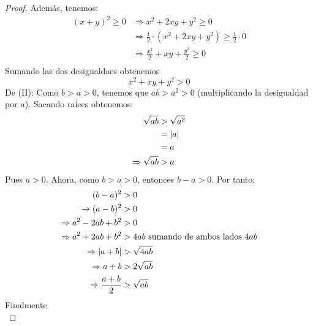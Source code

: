 \documentclass[12pt]{article}
\begin{document}
\begin{enumerate}
\begin{proof}
            Además, tenemos:
            \begin{equation*}
                \begin{split}
                    \left(x+y\right)^2\geq0 &\Rightarrow x^2+2xy+y^2\geq0 \\
                    &\Rightarrow \frac{1}{2}\cdot\left(x^2+2xy+y^2\right)\geq\frac{1}{2}\cdot0 \\
                    &\Rightarrow \frac{x^2}{2}+xy+\frac{y^2}{2}\geq0 \\
                \end{split}
            \end{equation*}
            Sumando las dos desigualdaes obtenemos
            \begin{equation*}
                x^2+xy+y^2>0
            \end{equation*}
            De (II): Como $b>a>0$, tenemos que $ab>a^2>0$ (multiplicando la desigualdad por $a$). Sacando raíces obtenemos:
            \begin{equation*}
                \begin{split}
                    \sqrt{ab}&>\sqrt{a^2}\\
                    &=\left| a \right|\\
                    &=a\\
                    \Rightarrow \sqrt{ab}&>a
                \end{split}
            \end{equation*}
            Pues $a>0$. Ahora, como $b>a>0$, entonces $b-a>0$. Por tanto:
            \begin{equation*}
                \begin{split}
                    (b-a)^2&>0\\
                    \rightarrow (a-b)^2&>0\\
                    \Rightarrow a^2-2ab+b^2&>0\\
                    \Rightarrow a^2+2ab+b^2&>4ab\textup{ sumando de ambos lados $4ab$}\\
                    \Rightarrow \left| a+b \right|&>\sqrt{4ab}\\
                    \Rightarrow a+b&>2\sqrt{ab}\\
                    \Rightarrow \frac{a+b}{2}&>\sqrt{ab}
                \end{split}
            \end{equation*}
            Finalmente
            \begin{equation*}

\end{equation*}
\end{proof}
\end{enumerate}
\end{document}
